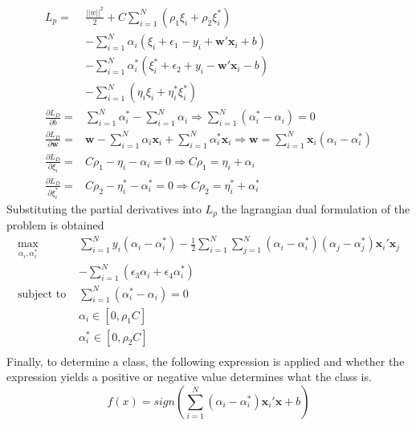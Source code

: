 \[
\begin{array}{cc}
L_p=&\frac{||w||^2}{2}+C\displaystyle\sum_{i=1}^N(\rho_1\xi_i + \rho_2\xi_i^*) \\
& - \displaystyle\sum_{i=1}^N \alpha_i(\xi_i + \epsilon_1 - y_i + \mathbf{w}'\mathbf{x}_i + b)\\
& - \displaystyle\sum_{i=1}^N \alpha_i^*(\xi_i^* + \epsilon_2 + y_i - \mathbf{w}'\mathbf{x}_i - b)\\
&-\displaystyle\sum_{i=1}^N (\eta_i \xi_i + \eta_i^* \xi_i^*)\\
\frac{\partial L_D}{\partial b} = &\displaystyle\sum_{i=1}^N \alpha_i^*  - \displaystyle\sum_{i=1}^N \alpha_i \Rightarrow \displaystyle\sum_{i=1}^N (\alpha_i^* - \alpha_i) = 0 \\
\frac{\partial L_D}{\partial \mathbf{w}} = & \mathbf{w}-\displaystyle\sum_{i=1}^N \alpha_i \mathbf{x}_i+\displaystyle\sum_{i=1}^N \alpha_i^* \mathbf{x}_i \Rightarrow \mathbf{w} = \displaystyle\sum_{i=1}^N \mathbf{x}_i (\alpha_i - \alpha_i^*)\\
\frac{\partial L_D}{\partial \xi_i} = & C\rho_1 - \eta_i -\alpha_i = 0 \Rightarrow  C\rho_1 = \eta_i + \alpha_i \\
\frac{\partial L_D}{\partial \xi_i^*} = &C\rho_2 - \eta_i^* -\alpha_i^* = 0 \Rightarrow  C\rho_2 = \eta_i^* + \alpha_i^*
\end{array}
\]
Substituting the partial derivatives into $L_p$ the lagrangian dual formulation of the problem is obtained
\begin{equation} \label{Eq:QuantileSVMduala}
\begin{array}{cc}
\displaystyle\max_{\alpha_i, \alpha_i^*}& \displaystyle\sum_{i=1}^N y_i(\alpha_i - \alpha_i^*) - \frac{1}{2} \displaystyle\sum_{i=1}^N\displaystyle\sum_{j=1}^N (\alpha_i - \alpha_i^*)(\alpha_j - \alpha_j^*)\mathbf{x}_i' \mathbf{x}_j \\
&-\displaystyle\sum_{i=1}^N (\epsilon_3\alpha_i + \epsilon_4\alpha_i^*) \\
\text{subject to    } & \displaystyle\sum_{i=1}^N(\alpha_i^* - \alpha_i)=0 \\
& \alpha_i \in [0,\rho_1C] \\
& \alpha_i^* \in [0,\rho_2C] \\
\end{array}
\end{equation}
Finally, to determine a class, the following expression is applied and whether the expression yields a positive or negative value determines what the class is.
\begin{equation}\label{finalpredictioneqn1}
f(x)=sign(\displaystyle\sum_{i=1}^N (\alpha_i - \alpha_i^*)\mathbf{x}_i'\mathbf{x} +b)
\end{equation}

